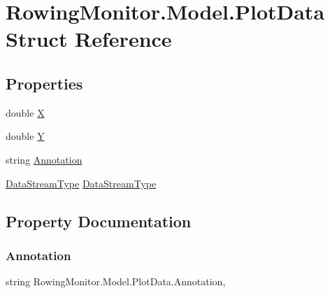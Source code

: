 \hypertarget{struct_rowing_monitor_1_1_model_1_1_plot_data}{}\section{Rowing\+Monitor.\+Model.\+Plot\+Data Struct Reference}
\label{struct_rowing_monitor_1_1_model_1_1_plot_data}
\subsection*{Properties}
\begin{DoxyCompactItemize}
\item 
double \hyperlink{struct_rowing_monitor_1_1_model_1_1_plot_data_a0e4ce74a471cf5ffbc621bcc18e6ceb8}{X}
\item 
double \hyperlink{struct_rowing_monitor_1_1_model_1_1_plot_data_aed25da377c94a8a3a8684623119b11e6}{Y}
\item 
string \hyperlink{struct_rowing_monitor_1_1_model_1_1_plot_data_a8340e2244b7b59bc7949dda192a8c99a}{Annotation}
\item 
\hyperlink{namespace_rowing_monitor_1_1_model_1_1_util_a01e1a06061533b246feb7421c9d0107f}{Data\+Stream\+Type} \hyperlink{struct_rowing_monitor_1_1_model_1_1_plot_data_a254e431007698194e2a440cba5fc48a5}{Data\+Stream\+Type}
\end{DoxyCompactItemize}


\subsection{Property Documentation}
\mbox{\label{struct_rowing_monitor_1_1_model_1_1_plot_data_a8340e2244b7b59bc7949dda192a8c99a}} 
\subsubsection{\texorpdfstring{Annotation}{Annotation}}
{\footnotesize\ttfamily string Rowing\+Monitor.\+Model.\+Plot\+Data.\+Annotation\hspace{0.3cm}{\ttfamily [get]}, {\ttfamily [set]}}

